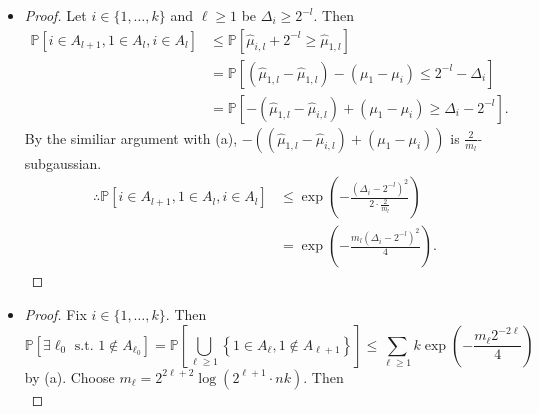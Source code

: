 \documentclass[10pt]{article}
\theoremstyle{definition}
\newenvironment{solution*}[1]{%
  \IfBlankTF{#1}
    {\renewcommand{\themanualsolutioninner}{\unskip}}
    {\renewcommand\themanualsolutioninner{#1}}%
  \manualsolutioninner
}{\endmanualsolutioninner}
\begin{document}
\begin{solution*}{}
\begin{itemize}
\begin{proof}
            Therefore
            \begin{align*}
                \mathbb{P}[1 \notin A_{l+1}, 1 \in A_l] &\leq \sum_{i=1}^k \exp \left( - \frac{m_l 2^{-2l}}{4} \right) \\
                &= k \exp \left( - \frac{m_l 2^{-2l}}{4} \right).
            \end{align*}
        \end{proof}
        \item[(b)] 
        \begin{proof}
            Let $i \in \{1, \ldots, k\}$ and $\ell \geq 1$ be $\Delta_i \geq 2^{-l}$.
            Then 
            \begin{align*}
                \mathbb{P}[i \in A_{l+1}, 1 \in A_l, i \in A_l] &\leq \mathbb{P}[\hat{\mu}_{i,l}+2^{-l} \geq \hat{\mu}_{1,l}] \\
                &= \mathbb{P}[(\hat{\mu}_{1,l} - \hat{\mu}_{1,l}) - (\mu_1 - \mu_i) \leq 2^{-l} - \Delta_i] \\
                &= \mathbb{P}[-(\hat{\mu}_{1,l} - \hat{\mu}_{i,l})+(\mu_1 - \mu_i) \geq \Delta_i - 2^{-l}].
            \end{align*}
            By the similiar argument with (a), $ - \left( \left( \hat{\mu}_{1,l} - \hat{\mu}_{i,l} \right) + \left( \mu_1 - \mu_i \right) \right) $ is $\frac{2}{m_l}$-subgaussian.
            \begin{align*}
                \therefore \mathbb{P}[i \in A_{l+1}, 1 \in A_l, i \in A_l] &\leq \exp \left( - \frac{(\Delta_i - 2^{-l})^2}{2 \cdot \frac{2}{m_l}} \right) \\
                &= \exp \left( - \frac{m_l (\Delta_i - 2^{-l})^2}{4} \right).
            \end{align*}
        \end{proof}
        \item[(c)]
        \begin{proof}
            Fix $i \in \{1, \ldots, k \}$. Then
            \begin{equation*}
                \mathbb{P}\left[\exists \ell_0 \text{ s.t. } 1 \notin A_{\ell_0}\right] 
                = \mathbb{P} \left[ \bigcup_{\ell \geq 1} \left\{ 1\in A_\ell, 1 \notin A_{\ell+1} \right\} \right]
                \leq \sum_{\ell \geq 1} k \exp \left( - \frac{m_\ell 2^{-2\ell}}{4} \right)
            \end{equation*}
            by (a).
            Choose $m_\ell = 2^{2\ell+2} \log (2^{\ell+1} \cdot nk)$. Then
            \begin{equation*}

\end{equation*}
\end{proof}
\end{itemize}
\end{solution*}
\end{document}
